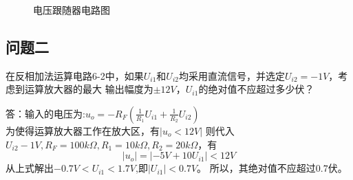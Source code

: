 \documentclass[a4paper,11pt,UTF8]{ctexart}
\begin{document}
\begin{figure}[htbp]
  \centering
  \caption{电压跟随器电路图}
  \label{fig:follow}
  \end{figure}
\subsection{问题二}
在反相加法运算电路6-2中，如果$U_{i1}$和$U_{i2}$均采用直流信号，并选定$U_{i2}=-1V$，考虑到运算放大器的最大
输出幅度为$±12V$，$U_{i1}$的绝对值不应超过多少伏？

答：输入的电压为:$u_o=-R_F(\frac{1}{R_1}U_{i1}+\frac{1}{R_2}U_{i2})$\\
为使得运算放大器工作在放大区，有$|u_o<12V|$
则代入$U_{i2}-1V,R_F=100k\Omega,R_1=10k\Omega,R_2=20k\Omega$，有
\begin{equation}
  |u_o|=|-5V+10U_{i1}|<12V
\end{equation}
从上式解出$-0.7V<U_{i1}<1.7V$,即$|U_{i1}|<0.7V$。
所以，其绝对值不应超过$0.7$伏。
\end{document}
